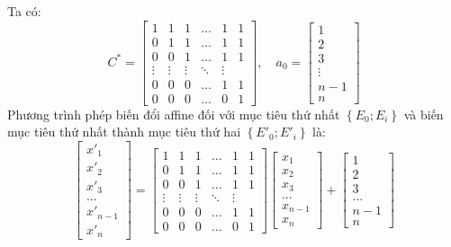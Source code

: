 \documentclass[12pt,a4paper]{article}
\begin{document}
Ta có:
\[
C^* =
\begin{bmatrix}
1 & 1 & 1 & \dots & 1 & 1 \\
0 & 1 & 1 & \dots & 1 & 1 \\
0 & 0 & 1 & \dots & 1 & 1 \\
\vdots & \vdots & \vdots & \ddots & \vdots \\
0 & 0 & 0 & \dots & 1 & 1 \\
0 & 0 & 0 & \dots & 0 & 1
\end{bmatrix},
\quad
a_0 =
\begin{bmatrix}
1 \\ 2 \\ 3 \\ \vdots \\ n-1 \\  n
\end{bmatrix}
\]
Phương trình phép biến đổi affine đối với mục tiêu thứ nhất \( \left \{ E_0; E_i \right \} \) và biến mục tiêu thứ nhất thành mục tiêu thứ hai \( \left \{ E'_0; E'_i \right \} \) là: \[
\begin{bmatrix}
    x'_1 \\ x'_2 \\ x'_3 \\ ... \\ x'_{n-1} \\ x'_n
\end{bmatrix} = \begin{bmatrix}
1 & 1 & 1 & \dots & 1 & 1 \\
0 & 1 & 1 & \dots & 1 & 1 \\
0 & 0 & 1 & \dots & 1 & 1 \\
\vdots & \vdots & \vdots & \ddots & \vdots \\
0 & 0 & 0 & \dots & 1 & 1 \\
0 & 0 & 0 & \dots & 0 & 1
\end{bmatrix} \begin{bmatrix}
    x_1 \\ x_2 \\ x_3 \\ ... \\ x_{n-1} \\ x_n
\end{bmatrix} + \begin{bmatrix}
    1 \\ 2 \\ 3 \\ ... \\ n-1 \\ n
\end{bmatrix}
\]
\end{document}
